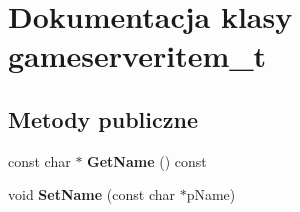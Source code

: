 \hypertarget{classgameserveritem__t}{}\section{Dokumentacja klasy gameserveritem\+\_\+t}
\label{classgameserveritem__t}
\subsection*{Metody publiczne}
\begin{DoxyCompactItemize}
\item 
\mbox{\label{classgameserveritem__t_a104a231aa39705135b6a64b6ac54c914}} 
const char $\ast$ {\bfseries Get\+Name} () const
\item 
\mbox{\label{classgameserveritem__t_a6ec4fca79899e69b0d157c4dcd385bc5}} 
void {\bfseries Set\+Name} (const char $\ast$p\+Name)
\end{DoxyCompactItemize}
